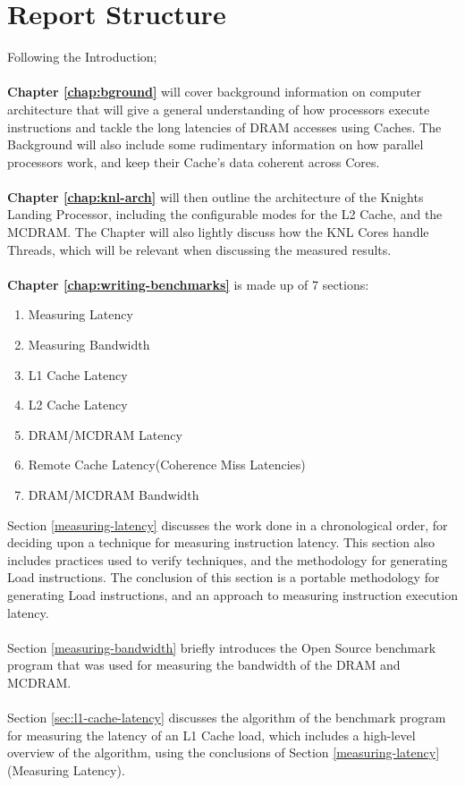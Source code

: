 \documentclass[bsc,frontabs,twoside,singlespacing,parskip,deptreport]{infthesis}     %
\begin{document}
\section{Report Structure}
Following the Introduction; \\
\\
\textbf{Chapter \ref{chap:bground}} will cover background information on computer architecture that will give a general understanding of how processors execute instructions and tackle the long latencies of DRAM accesses using Caches. The Background will also include some rudimentary information on how parallel processors work, and keep their Cache's data coherent across Cores. \\
\\
\textbf{Chapter \ref{chap:knl-arch}} will then outline the architecture of the Knights Landing Processor, including the configurable modes for the L2 Cache, and the MCDRAM. The Chapter will also lightly discuss how the KNL Cores handle Threads, which will be relevant when discussing the measured results. \\
\\
\textbf{Chapter \ref{chap:writing-benchmarks}} is made up of 7 sections:
\begin{enumerate}
    \item Measuring Latency
    \item Measuring Bandwidth
    \item L1 Cache Latency
    \item L2 Cache Latency
    \item DRAM/MCDRAM Latency
    \item Remote Cache Latency(Coherence Miss Latencies)
    \item DRAM/MCDRAM Bandwidth
\end{enumerate}
Section \ref{measuring-latency} discusses the work done in a chronological order, for deciding upon a technique for measuring instruction latency. This section also includes practices used to verify techniques, and the methodology for generating Load instructions. The conclusion of this section is a portable methodology for generating Load instructions, and an approach to measuring instruction execution latency. \\
\\
Section \ref{measuring-bandwidth} briefly introduces the Open Source benchmark program that was used for measuring the bandwidth of the DRAM and MCDRAM. \\
\\
Section \ref{sec:l1-cache-latency} discusses the algorithm of the benchmark program for measuring the latency of an L1 Cache load, which includes a high-level overview of the algorithm, using the conclusions of Section \ref{measuring-latency}(Measuring Latency). \\
\end{document}
